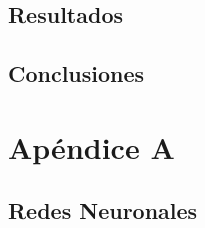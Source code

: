 \documentclass[12pt]{book} %
\begin{document}
\section{Resultados}

\section{Conclusiones}

\chapter*{Apéndice A}
\markboth{}{}
\thispagestyle{empty}
\lhead[\thepage]{}
\rhead[]{\thepage}
\newpage


	\section{Redes Neuronales \label{a-neuronales}}


\newpage
\printnoidxglossaries
{}
\end{document}
